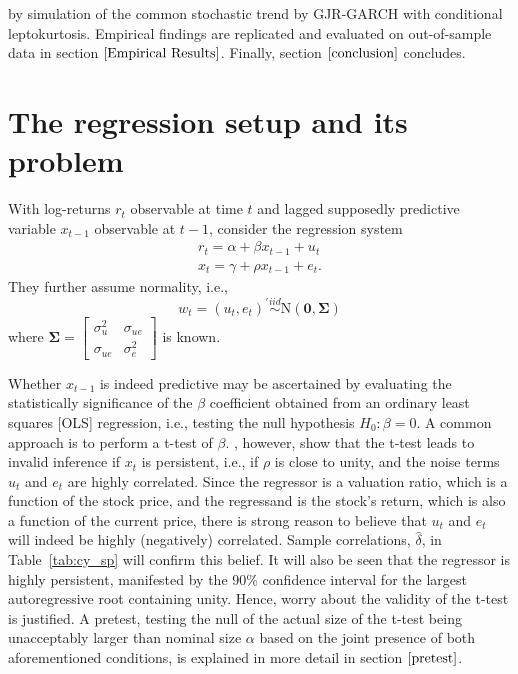 \documentclass{article}
\begin{document}
by simulation of the common stochastic trend by GJR-GARCH with conditional leptokurtosis. Empirical findings are replicated and evaluated on out-of-sample data in section $\ref{Empirical Results}$. Finally, section $\ref{conclusion}$ concludes.

\section{The regression setup and its problem}
\label{regression}
With log-returns $r_{t}$ observable at time $t$ and lagged supposedly predictive variable $x_{t-1}$ observable at $t-1$,  \citet{campbell2006efficient} consider the regression system
\begin{align} 
\label{eqn:1}
r_{t} = \alpha + \beta x_{t-1} + u_{t} \\ 
\label{eqn:2}
x_{t} = \gamma + \rho  x_{t-1} + e_{t}.
\end{align}
They further assume normality, i.e., 
\begin{equation}
w_{t}=\left(u_{t}, e_{t}\right)^{\prime} \stackrel{i i d}{\sim} \mathrm{N}(\boldsymbol{0}, \boldsymbol{\Sigma})
\end{equation} where  $\boldsymbol{\Sigma}=\left[\begin{array}{cc}{\sigma_{u}^{2}} & {\sigma_{u e}} \\ {\sigma_{u e}} & {\sigma_{e}^{2}}\end{array}\right]$ is known.


Whether $x_{t-1}$ is indeed predictive may be ascertained by evaluating the statistically significance of the $\beta$ coefficient obtained from an ordinary least squares [OLS] regression, i.e., testing the null hypothesis $H_0: \beta = 0$. A common approach is to perform a t-test of $\beta$. \citet{elliott1994inference}, however, show that the t-test leads to invalid inference if $x_{t}$ is persistent, i.e., if $\rho$ is close to unity, and the noise terms $u_{t}$ and $e_{t}$ are highly correlated. Since the regressor is a valuation ratio, which is a function of the stock price, and the regressand is the stock's return, which is also a function of the current price, there is strong reason to believe that $u_{t}$ and $e_{t}$ will indeed be highly (negatively) correlated. Sample correlations, $\hat{\delta}$, in Table~\vref{tab:cy_sp} will confirm this belief. It will also be seen that the regressor is highly persistent, manifested by the 90\% confidence interval for the largest autoregressive root containing unity. Hence, worry about the validity of the t-test is justified. A pretest, testing the null of the actual size of the t-test being unacceptably larger than nominal size $\alpha$ based on the joint presence of both aforementioned conditions, is explained in more detail in section $\ref{pretest}$.
\end{document}
